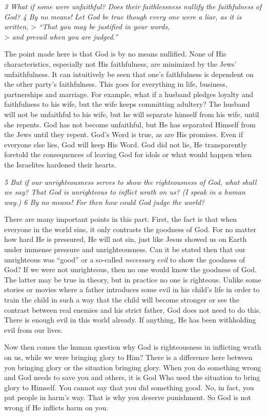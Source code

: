 \emph{3 What if some were unfaithful? Does their faithlessness nullify
the faithfulness of God? 4 By no means! Let God be true though every one
were a liar, as it is written,} \textgreater{} \emph{``That you may be
justified in your words,}\\
\textgreater{} \emph{and prevail when you are judged.''}

The point made here is that God is by no means nullified. None of His
characteristics, especially not His faithfulness, are minimized by the
Jews' unfaithfulness. It can intuitively be seen that one's faithfulness
is dependent on the other party's faithfulness. This goes for everything
in life, business, partnerships and marriage. For example, what if a
husband pledges loyalty and faithfulness to his wife, but the wife keeps
committing adultery? The husband will not be unfaithful to his wife, but
he will separate himself from his wife, until she repents. God has not
become unfaithful, but He has separated Himself from the Jews until they
repent. God's Word is true, as are His promises. Even if everyone else
lies, God will keep His Word. God did not lie, He transparently foretold
the consequences of leaving God for idols or what would happen when the
Israelites hardened their hearts.

\emph{5 But if our unrighteousness serves to show the righteousness of
God, what shall we say? That God is unrighteous to inflict wrath on us?
(I speak in a human way.) 6 By no means! For then how could God judge
the world?}

There are many important points in this part. First, the fact is that
when everyone in the world sins, it only contrasts the goodness of God.
For no matter how hard He is pressured, He will not sin, just like Jesus
showed us on Earth under immense pressure and unrighteousness. Can it be
stated then that our unrighteous was ``good'' or a so-called
\emph{necessary evil} to show the goodness of God? If we were not
unrighteous, then no one would know the goodness of God. The latter may
be true in theory, but in practice no one is righteous. Unlike some
stories or movies where a father introduces some evil in his child's
life in order to train the child in such a way that the child will
become stronger or see the contrast between real enemies and his strict
father, God does not need to do this. There is enough evil in this world
already. If anything, He has been withholding evil from our lives.

Now then comes the human question why God is righteousness in inflicting
wrath on us, while we were bringing glory to Him? There is a difference
here between you bringing glory or the situation bringing glory. When
you do something wrong and God needs to save you and others, it is God
Who used the situation to bring glory to Himself. You cannot say that
you did something good. No, in fact, you put people in harm's way. That
is why you deserve punishment. So God is not wrong if He inflicts harm
on you.

